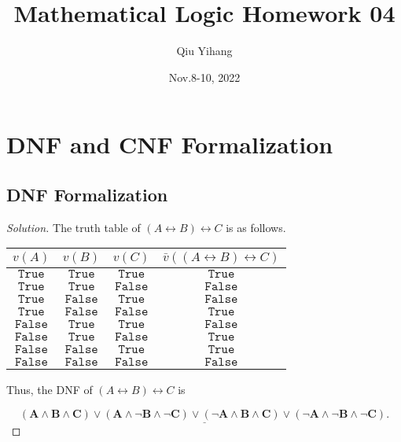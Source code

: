 \documentclass{article}
\title{\textbf{Mathematical Logic Homework 04}}
\author{Qiu Yihang}
\date{Nov.8-10, 2022}
\newenvironment{solution}{\begin{proof}[\noindent\it Solution]}{\end{proof}}
\begin{document}
\maketitle

\vspace{2.2em}
\section{DNF and CNF Formalization}
\vspace{1em}
\subsection{DNF Formalization}
\vspace{1em}
\begin{solution}
    The truth table of $\left(A\leftrightarrow B\right)\leftrightarrow C$ is as follows.

    \begin{table}[htbp]
        \centering
        \begin{tabular}{ccc|c}
            \hline
            $v(A)$ & $v(B)$ & $v(C)$ & $\bar{v}\left(\left(A\leftrightarrow B\right)\leftrightarrow C\right)$ \\
            \hline
            $\mathtt{True}$ & $\mathtt{True}$ & $\mathtt{True}$ & $\mathtt{True}$ \\
            $\mathtt{True}$ & $\mathtt{True}$ & $\mathtt{False}$ & $\mathtt{False}$ \\
            $\mathtt{True}$ & $\mathtt{False}$ & $\mathtt{True}$ & $\mathtt{False}$ \\
            $\mathtt{True}$ & $\mathtt{False}$ & $\mathtt{False}$ & $\mathtt{True}$ \\
            $\mathtt{False}$ & $\mathtt{True}$ & $\mathtt{True}$ & $\mathtt{False}$ \\
            $\mathtt{False}$ & $\mathtt{True}$ & $\mathtt{False}$ & $\mathtt{True}$ \\
            $\mathtt{False}$ & $\mathtt{False}$ & $\mathtt{True}$ & $\mathtt{True}$ \\
            $\mathtt{False}$ & $\mathtt{False}$ & $\mathtt{False}$ & $\mathtt{False}$ \\
            \hline
        \end{tabular}
    \end{table}

    \hspace{2.6em}
    Thus, the DNF of $\left(A\leftrightarrow B\right)\leftrightarrow C$ is 

    \vspace{-1.5em}
    $$\underline{\boldsymbol{\left(A\land B\land C\right)\lor\left(A\land\neg B\land\neg C\right)\lor\left(\neg A\land B\land C\right)\lor\left(\neg A\land\neg B\land\neg C\right)}.}$$

\vspace{-2.75em}
\end{solution}
\end{document}
